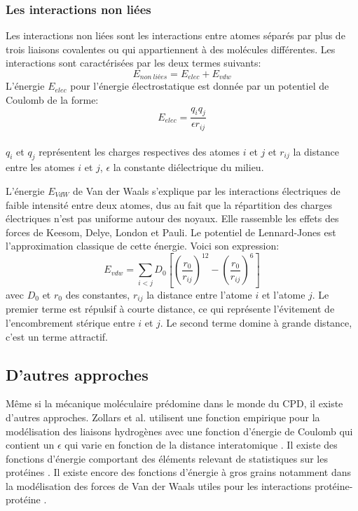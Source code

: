 \subsubsection{Les interactions non liées}
Les interactions non liées sont les interactions entre atomes séparés par plus de trois liaisons covalentes ou qui appartiennent à des molécules différentes. Les interactions sont caractérisées par les deux termes suivants:
\begin{equation}
E_{non\ liées} = E_{elec} + E_{vdw}  
\end{equation}
L'énergie $E_{elec}$ pour l'énergie électrostatique est donnée par un potentiel de Coulomb de la forme:
\begin{equation}
  E_{elec}=\frac{q_iq_j}{\epsilon r_{ij}}
\end{equation}\\
$q_i$ et $q_j$ représentent les charges respectives des atomes $i$ et $j$ et $r_{ij}$ la distance entre les atomes $i$ et $j$, $\epsilon$ la constante diélectrique du milieu.

L'énergie  $E_{VdW}$ de Van der Waals s'explique par les interactions électriques de faible intensité entre deux atomes, dus au fait que la répartition des charges électriques n'est pas uniforme autour des noyaux. Elle rassemble les effets des forces de Keesom, Delye, London et Pauli. Le potentiel de Lennard-Jones est l'approximation classique de cette énergie. Voici son expression:
\begin{equation}
    \label{VdW}
E_{vdw} = \sum_{i<j}D_0 [(\frac{r_0}{r_{ij}})^{12} - (\frac{r_0}{r_{ij}})^6]  
\end{equation}
avec $D_0$ et $r_0$ des constantes, $r_{ij}$ la distance entre l'atome $i$ et l'atome $j$. Le premier terme est répulsif à courte distance, ce qui représente l'évitement de l'encombrement stérique entre $i$ et $j$. Le second terme domine à grande distance, c'est un terme attractif. 
  

\subsection{D'autres approches}

Même si la mécanique moléculaire prédomine dans le monde du CPD, il existe d'autres approches. Zollars et al. utilisent une fonction empirique pour la modélisation des liaisons hydrogènes avec une fonction d'énergie de Coulomb qui contient un $\epsilon$ qui varie en fonction de la distance interatomique \cite{Zollars06}. Il existe des fonctions d'énergie comportant des éléments relevant de statistiques sur les protéines \cite{Pokala05}. Il existe encore des fonctions d'énergie à gros grains notamment dans la modélisation des forces de Van der Waals utiles pour les interactions protéine-protéine \cite{Korkut09}.

